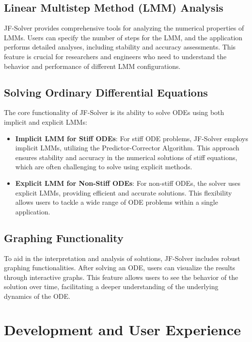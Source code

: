 \documentclass[a4paper, twoside]{report} %
\begin{document}
	\subsection{Linear Multistep Method (LMM) Analysis}

	JF-Solver provides comprehensive tools for analyzing the numerical properties of LMMs. Users can specify the number of steps for the LMM, and the application performs detailed analyses, including stability and accuracy assessments. This feature is crucial for researchers and engineers who need to understand the behavior and performance of different LMM configurations.

	\subsection{Solving Ordinary Differential Equations}

	The core functionality of JF-Solver is its ability to solve ODEs using both implicit and explicit LMMs:

	\begin{itemize}
		\item \textbf{Implicit LMM for Stiff ODEs}: For stiff ODE problems, JF-Solver employs implicit LMMs, utilizing the Predictor-Corrector Algorithm. This approach ensures stability and accuracy in the numerical solutions of stiff equations, which are often challenging to solve using explicit methods.

		\item \textbf{Explicit LMM for Non-Stiff ODEs}: For non-stiff ODEs, the solver uses explicit LMMs, providing efficient and accurate solutions. This flexibility allows users to tackle a wide range of ODE problems within a single application.
	\end{itemize}

	\subsection{Graphing Functionality}

	To aid in the interpretation and analysis of solutions, JF-Solver includes robust graphing functionalities. After solving an ODE, users can visualize the results through interactive graphs. This feature allows users to see the behavior of the solution over time, facilitating a deeper understanding of the underlying dynamics of the ODE.

	\section{Development and User Experience}
\end{document}
